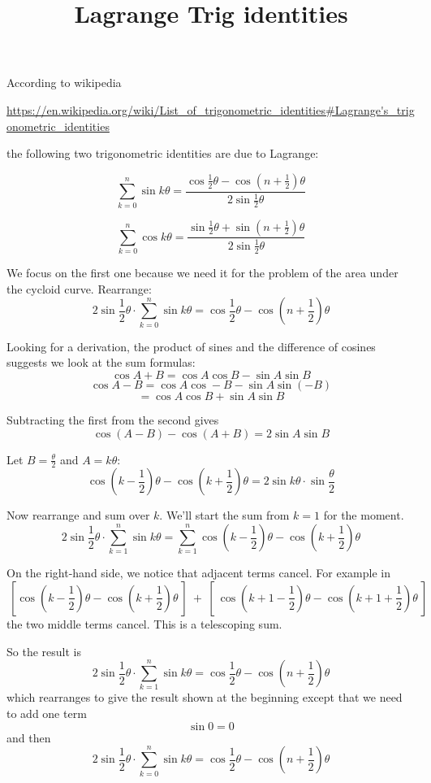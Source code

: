 \documentclass[11pt, oneside]{article}
\title{Lagrange Trig identities}
\date{}
\begin{document}
\maketitle
\Large


According to wikipedia

\url{https://en.wikipedia.org/wiki/List_of_trigonometric_identities#Lagrange's_trigonometric_identities}

the following two trigonometric identities are due to Lagrange:

\[ \sum_{k=0}^n \sin k \theta = \frac {\cos {\frac 1 2} \theta - \cos (n + {\frac 1 2}) \theta} {2 \sin {\frac 1 2} \theta} \]

\[ \sum_{k=0}^n \cos k \theta = \frac {\sin {\frac 1 2} \theta + \sin (n + {\frac 1 2}) \theta} {2 \sin {\frac 1 2} \theta} \]

We focus on the first one because we need it for the problem of the area under the cycloid curve.  Rearrange:
\[ 2 \sin {\frac 1 2} \theta \cdot \sum_{k=0}^n \sin k \theta =  \cos {\frac 1 2} \theta - \cos (n + {\frac 1 2}) \theta  \]

Looking for a derivation, the product of sines and the difference of cosines suggests we look at the sum formulas:
\[ \cos A + B = \cos A \cos B - \sin A \sin B \]
\[ \cos A - B = \cos A \cos -B - \sin A \sin (- B) \]
\[ = \cos A \cos B + \sin A \sin B \]

Subtracting the first from the second gives
\[ \cos (A - B) - \cos (A + B) = 2 \sin A \sin B \]

Let $B = {\frac \theta 2}$ and $A = k \theta$:
\[ \cos (k -  {\frac 1 2}) \theta  - \cos (k +  {\frac 1 2}) \theta = 2 \sin k \theta \cdot  \sin {\frac \theta 2} \]

Now rearrange and sum over $k$.  We'll start the sum from $k=1$ for the moment.
\[ 2 \sin {\frac 1 2} \theta  \cdot \sum_{k=1}^n \sin k \theta = \sum_{k=1}^n  \cos (k -  {\frac 1 2}) \theta  - \cos (k +  {\frac 1 2}) \theta \]

On the right-hand side, we notice that adjacent terms cancel.  For example in
\[ \ [ \cos (k -  {\frac 1 2}) \theta  - \cos (k +  {\frac 1 2}) \theta \ ] \ + \ [ \ \cos (k + 1 -  {\frac 1 2}) \theta  - \cos (k + 1 +  {\frac 1 2}) \theta \ ] \]
the two middle terms cancel.  This is a telescoping sum.

So the result is
\[ 2 \sin {\frac 1 2} \theta  \cdot \sum_{k=1}^n \sin k \theta = \cos {\frac 1 2} \theta  - \cos (n +  {\frac 1 2}) \theta \]
which rearranges to give the result shown at the beginning except that we need to add one term
\[ \sin 0 = 0 \] 
and then
\[ 2 \sin {\frac 1 2} \theta  \cdot \sum_{k=0}^n \sin k \theta = \cos {\frac 1 2} \theta  - \cos (n +  {\frac 1 2}) \theta \]
\end{document}
